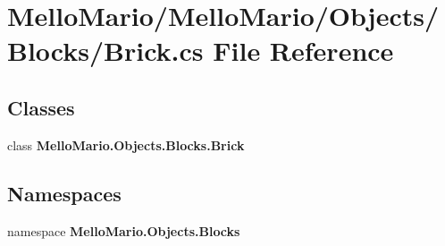 \section{Mello\+Mario/\+Mello\+Mario/\+Objects/\+Blocks/\+Brick.cs File Reference}
\label{Brick_8cs}
\subsection*{Classes}
\begin{DoxyCompactItemize}
\item 
class \textbf{ Mello\+Mario.\+Objects.\+Blocks.\+Brick}
\end{DoxyCompactItemize}
\subsection*{Namespaces}
\begin{DoxyCompactItemize}
\item 
namespace \textbf{ Mello\+Mario.\+Objects.\+Blocks}
\end{DoxyCompactItemize}

